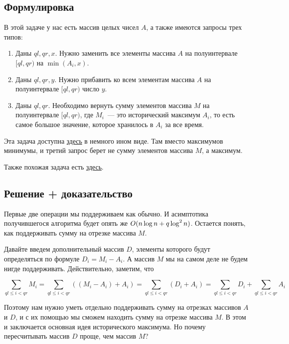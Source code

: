 \subsection{Формулировка}

В этой задаче у нас есть массив целых чисел $A$, а также имеются запросы трех типов:

\begin{enumerate}
    \item Даны $ql, qr, x$. Нужно заменить все элементы массива $A$ на полуинтервале $[ql, qr)$ на $\min(A_i, x)$.
    \item Даны $ql, qr, y$. Нужно прибавить ко всем элементам массива $A$ на полуинтервале $[ql, qr)$ число $y$.
    \item Даны $ql, qr$. Необходимо вернуть сумму элементов массива $M$ на полуинтервале $[ql, qr)$, где $M_i$~--- это исторический максимум $A_i$, то есть самое большое значение, которое хранилось в $A_i$ за все время.
\end{enumerate}

Эта задача доступна \href{https://uoj.ac/problem/169}{здесь} в немного ином виде. Там вместо максимумов минимумы, и третий запрос берет не сумму элементов массива $M$, а максимум.

Также похожая задача есть \href{https://www.luogu.com.cn/problem/P4314}{здесь}.

\subsection{Решение + доказательство}

Первые две операции мы поддерживаем как обычно. И асимптотика получившегося алгоритма будет опять же $O(n \log n + q \log^2 n)$. Остается понять, как поддерживать сумму на отрезке массива $M$.

Давайте введем дополнительный массив $D$, элементы которого будут определяться по формуле $D_i = M_i - A_i$. А массив $M$ мы на самом деле не будем нигде поддерживать. Действительно, заметим, что

$$
\sum_{ql \le i < qr} M_i = \sum_{ql \le i < qr} \left( \left(M_i - A_i \right) + A_i \right) =
\sum_{ql \le i < qr} \left( D_i + A_i \right) = \sum_{ql \le i < qr} D_i + \sum_{ql \le i < qr} A_i
$$

Поэтому нам нужно уметь отдельно поддерживать сумму на отрезках массивов $A$ и $D$, и с их помощью мы сможем находить сумму на отрезке массива $M$. В этом и заключается основная идея исторического максимума. Но почему пересчитывать массив $D$ проще, чем массив $M$?

